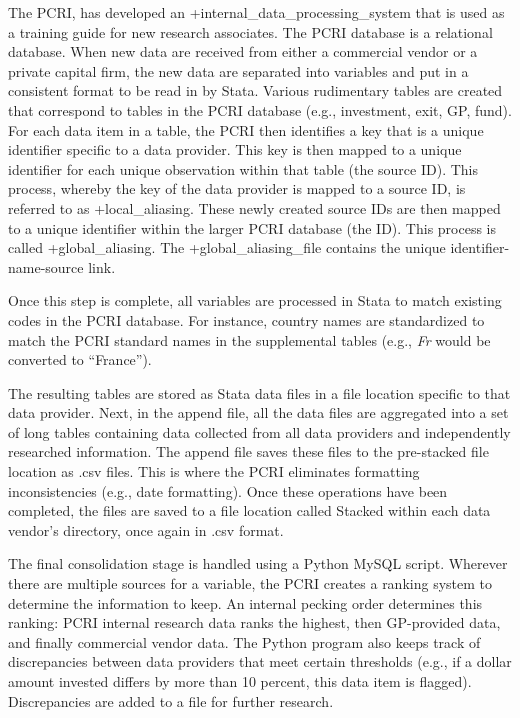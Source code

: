 \documentclass[
]{WileySix}
\begin{document}
The PCRI, has developed an +internal\_data\_processing\_system\textbar{} that is used as a training guide for new research associates. The PCRI database is a relational database. When new data are received from either a commercial vendor or a private capital firm, the new data are separated into variables and put in a consistent format to be read in by Stata. Various rudimentary tabl­es are created that correspond to tables in the PCRI database (e.g., investment, exit, GP, fund). For each data item in a table, the PCRI then identifies a key that is a unique identifier specific to a data provider. This key is then mapped to a unique identifier for each unique observation within that table (the source ID). This process, whereby the key of the data provider is mapped to a source ID, is referred to as +local\_aliasing\textbar. These newly created source IDs are then mapped to a unique identifier within the larger PCRI database (the ID). This process is called +global\_aliasing\textbar. The +global\_aliasing\_file\textbar{} contains the unique identifier-name-source link.

Once this step is complete, all variables are processed in Stata to match existing codes in the PCRI database. For instance, country names are standardized to match the PCRI standard names in the supplemental tables (e.g., \emph{Fr} would be converted to ``France'').

The resulting tables are stored as Stata data files in a file location specific to that data provider. Next, in the append file, all the data files are aggregated into a set of long tables containing data collected from all data providers and independently researched information. The append file saves these files to the pre-stacked file location as .csv files. This is where the PCRI eliminates formatting inconsistencies (e.g., date formatting). Once these operations have been completed, the files are saved to a file location called Stacked within each data vendor's directory, once again in .csv format.

The final consolidation stage is handled using a Python MySQL script. Wherever there are multiple sources for a variable, the PCRI creates a ranking system to determine the information to keep. An internal pecking order determines this ranking: PCRI internal research data ranks the highest, then GP-provided data, and finally commercial vendor data. The Python program also keeps track of discrepancies between data providers that meet certain thresholds (e.g., if a dollar amount invested differs by more than 10 percent, this data item is flagged). Discrepancies are added to a file for further research.
\end{document}
